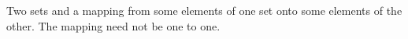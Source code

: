 Two sets and a mapping from some elements of one set
onto some elements of the other. The mapping need not be
one to one.